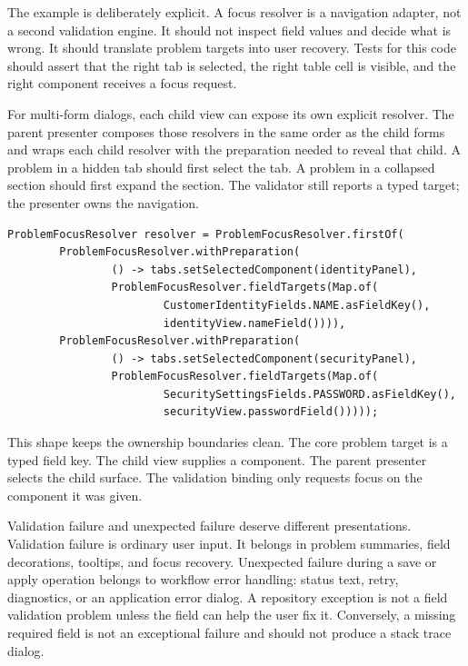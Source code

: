 The example is deliberately explicit. A focus resolver is a navigation adapter,
not a second validation engine. It should not inspect field values and decide
what is wrong. It should translate problem targets into user recovery. Tests
for this code should assert that the right tab is selected, the right table
cell is visible, and the right component receives a focus request.

For multi-form dialogs, each child view can expose its own explicit resolver.
The parent presenter composes those resolvers in the same order as the child
forms and wraps each child resolver with the preparation needed to reveal that
child. A problem in a hidden tab should first select the tab. A problem in a
collapsed section should first expand the section. The validator still reports
a typed target; the presenter owns the navigation.

\begin{lstlisting}[caption={Reveal the child view before focusing its problem.}]
ProblemFocusResolver resolver = ProblemFocusResolver.firstOf(
        ProblemFocusResolver.withPreparation(
                () -> tabs.setSelectedComponent(identityPanel),
                ProblemFocusResolver.fieldTargets(Map.of(
                        CustomerIdentityFields.NAME.asFieldKey(),
                        identityView.nameField()))),
        ProblemFocusResolver.withPreparation(
                () -> tabs.setSelectedComponent(securityPanel),
                ProblemFocusResolver.fieldTargets(Map.of(
                        SecuritySettingsFields.PASSWORD.asFieldKey(),
                        securityView.passwordField()))));
\end{lstlisting}

This shape keeps the ownership boundaries clean. The core problem target is a
typed field key. The child view supplies a component. The parent presenter
selects the child surface. The validation binding only requests focus on the
component it was given.

Validation failure and unexpected failure deserve different presentations.
Validation failure is ordinary user input. It belongs in problem summaries,
field decorations, tooltips, and focus recovery. Unexpected failure during a
save or apply operation belongs to workflow error handling: status text, retry,
diagnostics, or an application error dialog. A repository exception is not a
field validation problem unless the field can help the user fix it. Conversely,
a missing required field is not an exceptional failure and should not produce a
stack trace dialog.

